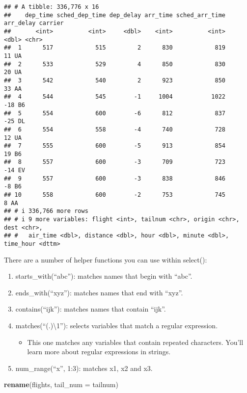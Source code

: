 \documentclass[
]{article}
\newenvironment{Shaded}{\begin{snugshade}}{\end{snugshade}}
\newcommand{\AttributeTok}[1]{\textcolor[rgb]{0.13,0.29,0.53}{#1}}
\newcommand{\FunctionTok}[1]{\textcolor[rgb]{0.13,0.29,0.53}{\textbf{#1}}}
\newcommand{\NormalTok}[1]{#1}
\providecommand{\tightlist}{%
  \setlength{\itemsep}{0pt}\setlength{\parskip}{0pt}}
\begin{document}
\begin{verbatim}
## # A tibble: 336,776 x 16
##    dep_time sched_dep_time dep_delay arr_time sched_arr_time arr_delay carrier
##       <int>          <int>     <dbl>    <int>          <int>     <dbl> <chr>  
##  1      517            515         2      830            819        11 UA     
##  2      533            529         4      850            830        20 UA     
##  3      542            540         2      923            850        33 AA     
##  4      544            545        -1     1004           1022       -18 B6     
##  5      554            600        -6      812            837       -25 DL     
##  6      554            558        -4      740            728        12 UA     
##  7      555            600        -5      913            854        19 B6     
##  8      557            600        -3      709            723       -14 EV     
##  9      557            600        -3      838            846        -8 B6     
## 10      558            600        -2      753            745         8 AA     
## # i 336,766 more rows
## # i 9 more variables: flight <int>, tailnum <chr>, origin <chr>, dest <chr>,
## #   air_time <dbl>, distance <dbl>, hour <dbl>, minute <dbl>, time_hour <dttm>
\end{verbatim}

There are a number of helper functions you can use within select():

\begin{enumerate}
\def\labelenumi{\arabic{enumi}.}
\tightlist
\item
  starts\_with(``abc''): matches names that begin with ``abc''.
\item
  ends\_with(``xyz''): matches names that end with ``xyz''.
\item
  contains(``ijk''): matches names that contain ``ijk''.
\item
  matches(``(.)\textbackslash1''): selects variables that match a
  regular expression.

  \begin{itemize}
  \tightlist
  \item
    This one matches any variables that contain repeated characters.
    You'll learn more about regular expressions in strings.
  \end{itemize}
\item
  num\_range(``x'', 1:3): matches x1, x2 and x3.
\end{enumerate}

\begin{Shaded}
\begin{Highlighting}[]
\FunctionTok{rename}\NormalTok{(flights, }\AttributeTok{tail\_num =}\NormalTok{ tailnum)}
\end{Highlighting}
\end{Shaded}
\end{document}
